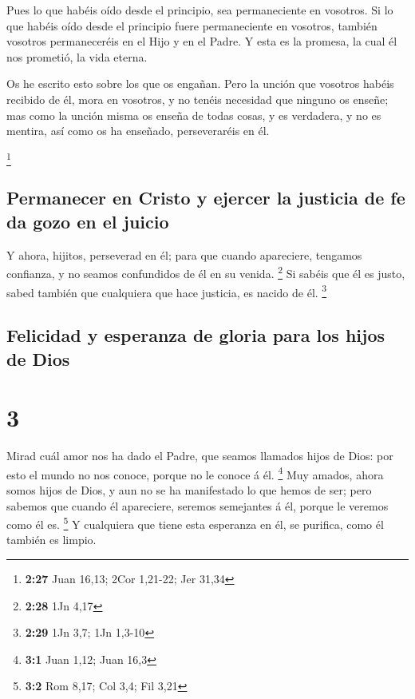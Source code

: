  Pues lo que habéis oído desde el principio, sea
permaneciente en vosotros. Si lo que habéis oído desde el principio
fuere permaneciente en vosotros, también vosotros permaneceréis en el
Hijo y en el Padre.  Y esta es la promesa, la cual él nos
prometió, la vida eterna.

 Os he escrito esto sobre los que os engañan. 
Pero la unción que vosotros habéis recibido de él, mora en vosotros, y
no tenéis necesidad que ninguno os enseñe; mas como la unción misma os
enseña de todas cosas, y es verdadera, y no es mentira, así como os ha
enseñado, perseveraréis en él.

\footnote{\textbf{2:27} Juan 16,13; 2Cor 1,21-22; Jer 31,34}

\hypertarget{permanecer-en-cristo-y-ejercer-la-justicia-de-fe-da-gozo-en-el-juicio}{%
\subsection{Permanecer en Cristo y ejercer la justicia de fe da gozo en
el
juicio}\label{permanecer-en-cristo-y-ejercer-la-justicia-de-fe-da-gozo-en-el-juicio}}

 Y ahora, hijitos, perseverad en él; para que cuando
apareciere, tengamos confianza, y no seamos confundidos de él en su
venida. \footnote{\textbf{2:28} 1Jn 4,17}  Si sabéis que él
es justo, sabed también que cualquiera que hace justicia, es nacido de
él. \footnote{\textbf{2:29} 1Jn 3,7; 1Jn 1,3-10}

\hypertarget{felicidad-y-esperanza-de-gloria-para-los-hijos-de-dios}{%
\subsection{Felicidad y esperanza de gloria para los hijos de
Dios}\label{felicidad-y-esperanza-de-gloria-para-los-hijos-de-dios}}

\hypertarget{section-2}{%
\section{3}\label{section-2}}

 Mirad cuál amor nos ha dado el Padre, que seamos llamados
hijos de Dios: por esto el mundo no nos conoce, porque no le conoce á
él. \footnote{\textbf{3:1} Juan 1,12; Juan 16,3}  Muy
amados, ahora somos hijos de Dios, y aun no se ha manifestado lo que
hemos de ser; pero sabemos que cuando él apareciere, seremos semejantes
á él, porque le veremos como él es. \footnote{\textbf{3:2} Rom 8,17; Col
  3,4; Fil 3,21}  Y cualquiera que tiene esta esperanza en
él, se purifica, como él también es limpio.

